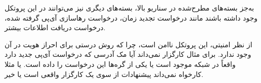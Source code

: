به‌جز بسته‌های مطرح‌شده در سناریو بالا، بسته‌های دیگری نیز می‌توانند در این پروتکل وجود داشته باشند مانند درخواست تجدید زمان، درخواست رهاسازی آی‌پی گرفته شده، درخواست دریافت اطلاعات بیشتر.

از نظر امنیتی، این پروتکل ناامن است، چرا که روش درستی برای احراز هویت در آن وجود ندارد. برای مثال کارگزار نمی‌داند آیا مک آدرسی که درخواست آی‌پی جدید دارد واقعاً در شبکه موجود است یا یکی از گره‌ها این درخواست را داده است. یا مثلا کارخواه نمی‌داند پیشنهادات از سوی یک کارگزار واقعی است یا خیر.